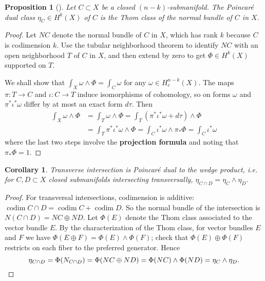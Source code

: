 \documentclass{report}
\theoremstyle{plain}
\newtheorem{proposition}[theorem]{Proposition}
\newtheorem{corollary}[theorem]{Corollary}
\theoremstyle{definition}
\theoremstyle{remark}
\DeclareMathOperator{\codim}{codim}
\begin{document}
\begin{proposition}[{\cite[Proposition 6.24a]{Bott1982}}] \label{thm:thom-normal}
  Let $C \subset X$ be a closed $(n-k)$-submanifold. The Poincar\'e
  dual class $\eta_C \in H^k(X)$ of $C$ is the Thom class of the
  normal bundle of $C$ in $X$.
\end{proposition}

\begin{proof}
  Let $NC$ denote the normal bundle of $C$ in $X$, which has rank $k$
  because $C$ is codimension $k$. Use the tubular neighborhood theorem
  to identify $NC$ with an open neighborhood $T$ of $C$ in $X$, and
  then extend by zero to get $\Phi \in H^k(X)$ supported on $T$.

  We shall show that $\int_X \omega \wedge \Phi = \int_C \omega$ for
  any $\omega \in H^{n-k}_c(X)$. The maps $\pi\colon T \to C$ and
  $\iota\colon C \to T$ induce isomorphisms of cohomology, so on forms
  $\omega$ and $\pi^*\iota^*\omega$ differ by at most an exact form
  $d\tau$. Then
  \begin{align*}
    \int_X \omega \wedge \Phi
    &= \int_T \omega \wedge \Phi = \int_T (\pi^*\iota^*\omega + d\tau) \wedge \Phi \\
    &= \int_T \pi^*\iota^*\omega \wedge \Phi = \int_C \iota^*\omega \wedge \pi_* \Phi = \int_C \iota^*\omega
  \end{align*}
  where the last two steps involve the {\bf projection formula}
  \cite[Proposition 6.15]{Bott1982} and noting that $\pi_* \Phi = 1$.
\end{proof}

\begin{corollary} \label{thm:wedge-dual}
  Transverse intersection is Poincar\'e dual to the wedge product,
  i.e. for $C, D \subset X$ closed submanifolds intersecting
  transversally, $\eta_{C \cap D} = \eta_C \wedge \eta_D$.
\end{corollary}

\begin{proof}
  For transversal intersections, codimension is additive: $\codim C
  \cap D = \codim C + \codim D$. So the normal bundle of the
  intersection is $N(C \cap D) = NC \oplus ND$. Let $\Phi(E)$ denote
  the Thom class associated to the vector bundle $E$. By the
  characterization of the Thom class, for vector bundles $E$ and $F$
  we have $\Phi(E \oplus F) = \Phi(E) \wedge \Phi(F)$; check that
  $\Phi(E) \oplus \Phi(F)$ restricts on each fiber to the preferred
  generator. Hence
  \[ \eta_{C \cap D} = \Phi(N_{C \cap D}) = \Phi(NC \oplus ND) = \Phi(NC) \wedge \Phi(ND) = \eta_C \wedge \eta_D. \qedhere \]
\end{proof}
\end{document}
